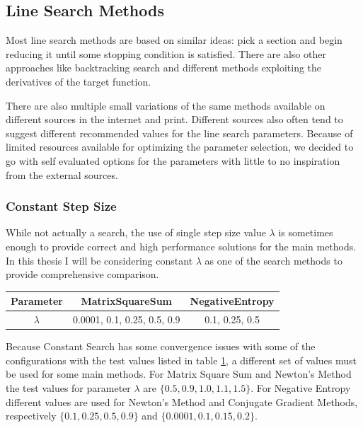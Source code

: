 \documentclass[a4paper,english,titlepage,12pt]{article}
\begin{document}
\subsection{Line Search Methods}
\label{sect:line_search_methods}


Most line search methods are based on similar ideas: pick a section and begin reducing it until some stopping condition is satisfied. There are also other approaches like backtracking search and different methods exploiting the derivatives of the target function.

There are also multiple small variations of the same methods available on different sources in the internet and print. Different sources also often tend to suggest different recommended values for the line search parameters. Because of limited resources available for optimizing the parameter selection, we decided to go with self evaluated options for the parameters with little to no inspiration from the external sources. \cite{book:convex_optimization} \cite{book:nonlinear_programming} 


\subsubsection{Constant Step Size}


While not actually a search, the use of single step size value $\lambda$ is sometimes enough to provide correct and high performance solutions for the main methods. In this thesis I will be considering constant $\lambda$ as one of the search methods to provide comprehensive comparison.

\begin{table}[H]
\label{tab:params_ConstantSearch}
\centering
{}
\begin{tabular}{|c|c|c|}
\hline
\rowcolor{gray!25}
Parameter & MatrixSquareSum & NegativeEntropy \\
\hline
$\lambda$ & 0.0001, 0.1, 0.25, 0.5, 0.9 & 0.1, 0.25, 0.5 \\
\hline
\end{tabular}
\end{table}

Because Constant Search has some convergence issues with some of the configurations with the test values listed in table \ref{tab:params_ConstantSearch}, a different set of values must be used for some main methods. For Matrix Square Sum and Newton's Method the test values for parameter $\lambda$ are $\{0.5, 0.9, 1.0, 1.1, 1.5\}$. For Negative Entropy different values are used for Newton's Method and Conjugate Gradient Methods, respectively $\{0.1, 0.25, 0.5, 0.9\}$ and $\{0.0001, 0.1, 0.15, 0.2\}$.
\end{document}

